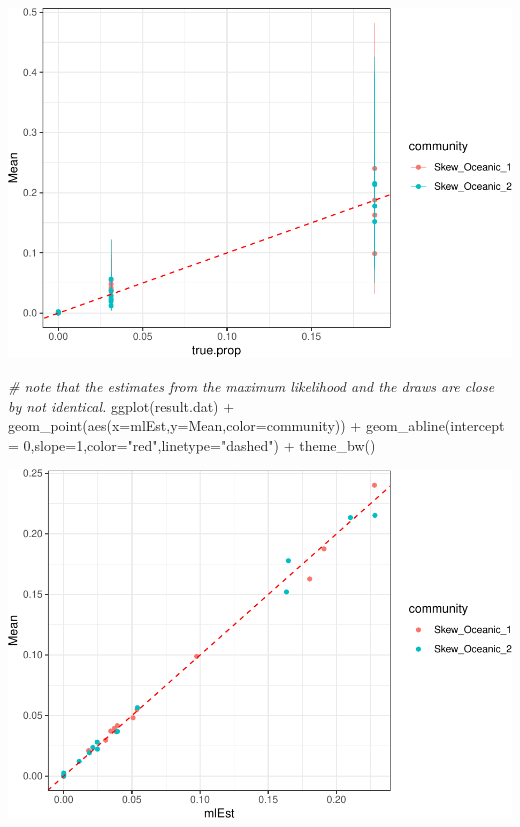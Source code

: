 \documentclass[
]{article}
\newenvironment{Shaded}{\begin{snugshade}}{\end{snugshade}}
\newcommand{\AttributeTok}[1]{\textcolor[rgb]{0.77,0.63,0.00}{#1}}
\newcommand{\CommentTok}[1]{\textcolor[rgb]{0.56,0.35,0.01}{\textit{#1}}}
\newcommand{\DecValTok}[1]{\textcolor[rgb]{0.00,0.00,0.81}{#1}}
\newcommand{\FunctionTok}[1]{\textcolor[rgb]{0.00,0.00,0.00}{#1}}
\newcommand{\NormalTok}[1]{#1}
\newcommand{\SpecialCharTok}[1]{\textcolor[rgb]{0.00,0.00,0.00}{#1}}
\newcommand{\StringTok}[1]{\textcolor[rgb]{0.31,0.60,0.02}{#1}}
\begin{document}
\includegraphics{Appendix-S4_files/figure-latex/stan_plots-3.pdf}

\begin{Shaded}
\begin{Highlighting}[]
\CommentTok{\# note that the estimates from the maximum likelihood and the draws are close by not identical.}
\FunctionTok{ggplot}\NormalTok{(result.dat) }\SpecialCharTok{+}
    \FunctionTok{geom\_point}\NormalTok{(}\FunctionTok{aes}\NormalTok{(}\AttributeTok{x=}\NormalTok{mlEst,}\AttributeTok{y=}\NormalTok{Mean,}\AttributeTok{color=}\NormalTok{community)) }\SpecialCharTok{+}
    \FunctionTok{geom\_abline}\NormalTok{(}\AttributeTok{intercept =} \DecValTok{0}\NormalTok{,}\AttributeTok{slope=}\DecValTok{1}\NormalTok{,}\AttributeTok{color=}\StringTok{"red"}\NormalTok{,}\AttributeTok{linetype=}\StringTok{"dashed"}\NormalTok{) }\SpecialCharTok{+}
    \FunctionTok{theme\_bw}\NormalTok{()}
\end{Highlighting}
\end{Shaded}

\includegraphics{Appendix-S4_files/figure-latex/stan_plots-4.pdf}
\end{document}
